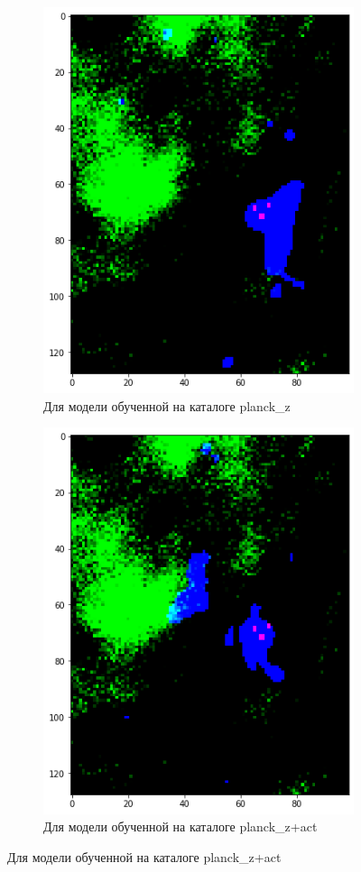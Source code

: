 \documentclass{article}
\begin{document}
\begin{enumerate}
\begin{figure}[h]
            \begin{subfigure}{0.5\textwidth}
                \includegraphics[width=0.7\linewidth]{pz_act_coma} 
                \caption{Для модели обученной на каталоге planck\_z}
            \end{subfigure}
            \begin{subfigure}{0.5\textwidth}
                \includegraphics[width=0.7\linewidth]{pz_coma}
                \caption{Для модели обученной на каталоге planck\_z+act}
            \end{subfigure}


\end{figure}
\end{enumerate}
\end{document}
